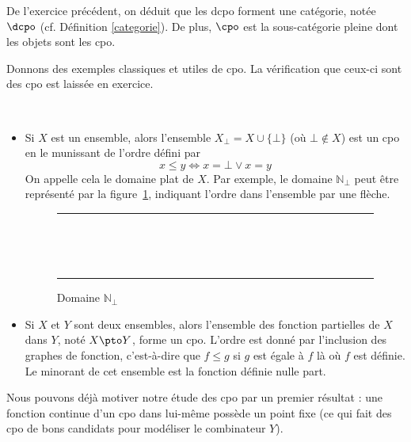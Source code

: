 De l'exercice précédent, on déduit que les dcpo forment une catégorie, notée $\dcpo$ (cf. Définition \ref{categorie}). De plus, $\cpo$ est la sous-catégorie pleine dont les objets sont les cpo.

Donnons des exemples classiques et utiles de cpo. La vérification que ceux-ci sont des cpo est laissée en exercice.

\begin{expl}
    \ 
    \begin{itemize}[label=$\bullet$]
        \item Si $X$ est un ensemble, alors l'ensemble $X_\bot=X\cup\{\bot\}$ (où $\bot\notin X$) est un cpo en le munissant de l'ordre défini par $$x\leq y\iff x=\bot \lor x=y$$ On appelle cela le domaine plat de $X$. Par exemple, le domaine $\mathbb N_\bot$ peut être représenté par la figure~\ref{Nbot}, indiquant l'ordre dans l'ensemble par une flèche.
        \begin{figure}[t]
        \centering
        \rule{17cm}{0.5pt}\\
        \vspace{1cm}
        \\
        \rule{17cm}{0.5pt}
        \caption{Domaine $\mathbb N_\bot$}
        \label{Nbot}
        \end{figure}
        
        \item Si $X$ et $Y$ sont deux ensembles, alors l'ensemble des fonction partielles de $X$ dans $Y$, noté $X\pto Y$, forme un cpo. L'ordre est donné par l'inclusion des graphes de fonction, c'est-à-dire que $f\leq g$ si $g$ est égale à $f$ là où $f$ est définie. Le minorant de cet ensemble est la fonction définie nulle part.
    \end{itemize}
\end{expl}

Nous pouvons déjà motiver notre étude des cpo par un premier résultat : une fonction continue d'un cpo dans lui-même possède un point fixe (ce qui fait des cpo de bons candidats pour modéliser le combinateur $Y$).

